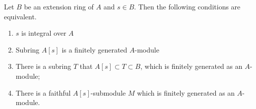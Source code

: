 \begin{theorem}
    \label{thm: integral}
    Let $B$ be an extension ring of $A$ and $s \in B$. Then the following conditions are equivalent.
    \begin{enumerate}
        \item
              $s$ is integral over $A$
        \item
              Subring $A[s]$ is a finitely generated $A$-module
        \item
              There is a subring $T$ that $A[s]\subset T\subset B$, which is finitely generated as an $A$-module;
        \item
              There is a faithful $A[s]$-submodule $M$ which is finitely generated as an $A$-module.
    \end{enumerate}
\end{theorem}


